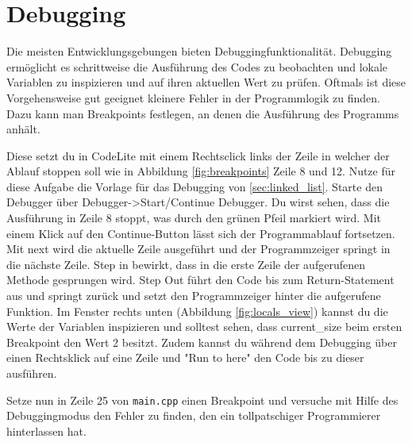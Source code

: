 \section{\ExercisePrefixMemory Debugging \optional}\label{sec:debugging}
\optionaltextbox


Die meisten Entwicklungsgebungen bieten Debuggingfunktionalität. Debugging ermöglicht es schrittweise die Ausführung des Codes zu beobachten und lokale Variablen zu inspizieren und auf ihren aktuellen Wert zu prüfen. Oftmals ist diese Vorgehensweise gut geeignet kleinere Fehler in der Programmlogik zu finden. Dazu kann man Breakpoints festlegen, an denen die Ausführung des Programms anhält.

 Diese setzt du in CodeLite mit einem Rechtsclick links der Zeile in welcher der Ablauf stoppen soll wie in Abbildung \ref{fig:breakpoints} Zeile 8 und 12. Nutze für diese Aufgabe die Vorlage für das Debugging von \ref{sec:linked_list}. Starte den Debugger über Debugger->Start/Continue Debugger. Du wirst sehen, dass die Ausführung in Zeile 8 stoppt, was durch den grünen Pfeil markiert wird. Mit einem Klick auf den Continue-Button lässt sich der Programmablauf fortsetzen. Mit next wird die aktuelle Zeile ausgeführt und der Programmzeiger springt in die nächste Zeile. Step in bewirkt, dass in die erste Zeile der aufgerufenen Methode gesprungen wird. Step Out führt den Code bis zum Return-Statement aus und springt zurück und setzt den Programmzeiger hinter die aufgerufene Funktion. Im Fenster rechts unten (Abbildung \ref{fig:locals_view}) kannst du die Werte der Variablen inspizieren und solltest sehen, dass current\_size beim ersten Breakpoint den Wert 2 besitzt. Zudem kannst du während dem Debugging über einen Rechtsklick auf eine Zeile und "Run to here"  den Code bis zu dieser ausführen.
 
 
 Setze nun in Zeile 25 von \lstinline{main.cpp} einen Breakpoint und versuche mit Hilfe des Debuggingmodus den Fehler zu finden, den ein tollpatschiger Programmierer hinterlassen hat.

